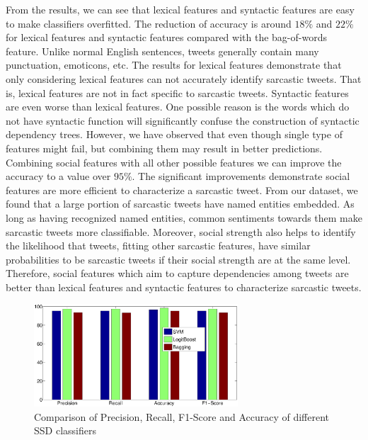 From the results, we can see that lexical features and syntactic features are easy to make classifiers overfitted. The reduction of accuracy is around $18\%$ and $22\%$ for lexical features and syntactic features compared with the bag-of-words feature. Unlike normal English sentences, tweets generally contain many punctuation, emoticons, etc. The results for lexical features demonstrate that only considering lexical features can not accurately identify sarcastic tweets. That is, lexical features are not in fact specific to sarcastic tweets. Syntactic features are even worse than lexical features. One possible reason is the words which do not have syntactic function will significantly confuse the construction of syntactic dependency trees. However, we have observed that even though single type of features might fail, but combining them may result in better predictions.\\

Combining social features with all other possible features we can improve the accuracy to a value over $95\%$. The significant improvements demonstrate social features are more efficient to characterize a sarcastic tweet. From our dataset, we found that a large portion of sarcastic tweets have named entities embedded. As long as having recognized named entities, common sentiments towards them make sarcastic tweets more classifiable. Moreover, social strength also helps to identify the likelihood that tweets, fitting other sarcastic features, have similar probabilities to be sarcastic tweets if their social strength are at the same level. Therefore, social features which aim to capture dependencies among tweets are better than lexical features and syntactic features to characterize sarcastic tweets.\\

\begin{figure}[hbt]
\centering
\includegraphics[width=3in, height= 2.4 in]{./figs/class.eps}
\caption{Comparison of Precision, Recall, F1-Score and Accuracy of different SSD classifiers}
\label{fig:classifier}
\end{figure}


